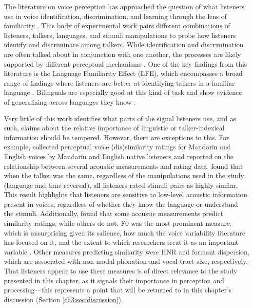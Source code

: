 The literature on voice perception has approached the question of what listeners use in voice identification, discrimination, and learning through the lens of familiarity \citep{levi_2019_methodological, perrachione_2018_recognizing}. This body of experimental work pairs different combinations of listeners, talkers, languages, and stimuli manipulations to probe how listeners identify and discriminate among talkers. While identification and discrimination are often talked about in conjunction with one another, the processes are likely supported by different perceptual mechanisms \citep{perrachione_2019_judgments}. One of the key findings from this literature is the Language Familiarity Effect (LFE), which encompasses a broad range of findings where listeners are better at identifying talkers in a familiar language \citep[for a recent review, see][]{perrachione_2018_recognizing}. Bilinguals are especially good at this kind of task and show evidence of generalizing across languages they know \citep{orena_2019_identifying}. 

Very little of this work identifies what parts of the signal listeners use, and as such, claims about the relative importance of linguistic or talker-indexical information should be tempered. However, there are exceptions to this. For example, \citet{perrachione_2019_judgments} collected perceptual voice (dis)similarity ratings for Mandarin and English voices by Mandarin and English native listeners and reported on the relationship between several acoustic measurements and rating data. \citet{perrachione_2019_judgments} found that when the talker was the same, regardless of the manipulations used in the study (language and time-reversal), all listeners rated stimuli pairs as highly similar. This result highlights that listeners are sensitive to low-level acoustic information present in voices, regardless of whether they know the language or understand the stimuli. Additionally, \citet{perrachione_2019_judgments} found that some acoustic measurements predict similarity ratings, while others do not. F0 was the most prominent measure, which is unsurprising given its salience, how much the voice variability literature has focused on it, and the extent to which researchers treat it as an important variable \cite[e.g.,][]{keating_2012_f0}. Other measures predicting similarity were HNR and formant dispersion, which are associated with non-modal phonation and vocal tract size, respectively. That listeners appear to use these measures is of direct relevance to the study presented in this chapter, as it signals their importance in perception and processing---this represents a point that will be returned to in this chapter's discussion (Section \ref{ch3:sec:discussion}).

